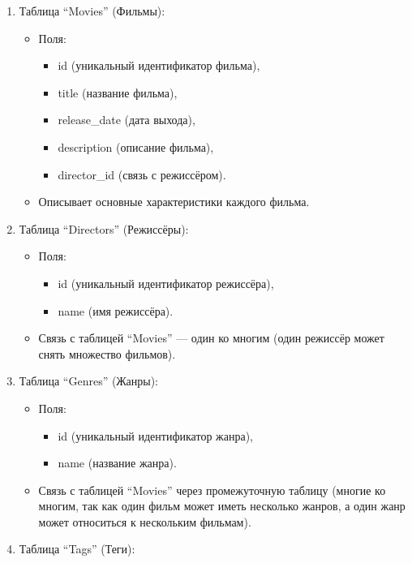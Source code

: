 \begin{enumerate}
    \item Таблица “Movies” (Фильмы):
    \begin{itemize}
        \item Поля: 
        \begin{itemize}
            \item id (уникальный идентификатор фильма),
            \item title (название фильма),
            \item release\_date (дата выхода),
            \item description (описание фильма),
            \item director\_id (связь с режиссёром).
        \end{itemize}
        \item Описывает основные характеристики каждого фильма.
    \end{itemize}
    \item Таблица “Directors” (Режиссёры):
    \begin{itemize}
        \item Поля: 
        \begin{itemize}
            \item id (уникальный идентификатор режиссёра),
            \item name (имя режиссёра).
        \end{itemize}
        \item Связь с таблицей “Movies” — один ко многим (один режиссёр может снять множество фильмов).
    \end{itemize}
    \item Таблица “Genres” (Жанры):
    \begin{itemize}
        \item Поля: 
        \begin{itemize}
            \item id (уникальный идентификатор жанра),
            \item name (название жанра).
        \end{itemize}
        \item Связь с таблицей “Movies” через промежуточную таблицу (многие ко многим, так как один фильм может иметь несколько жанров, а один жанр может относиться к нескольким фильмам).
    \end{itemize}
    \item Таблица “Tags” (Теги):
    \begin{itemize}

\end{itemize}
\end{enumerate}
